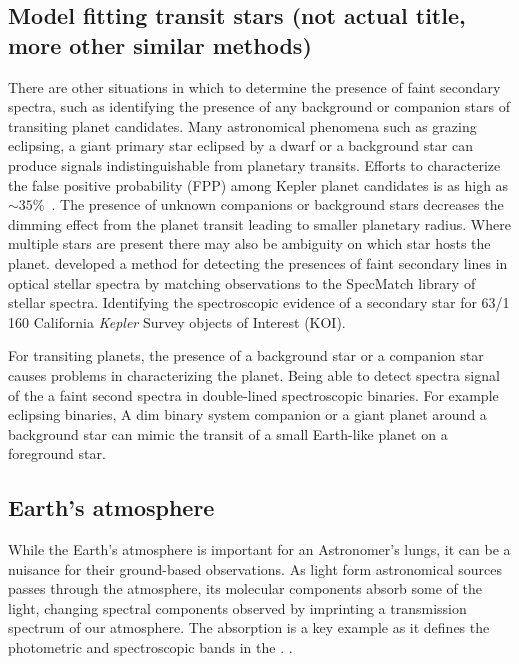 










\subsection{Model fitting transit stars (not actual title, more other similar methods)}
There are other situations in which to determine the presence of faint secondary spectra, such as identifying the presence of any background or companion stars of transiting planet candidates.
Many astronomical phenomena such as grazing eclipsing, a giant primary star eclipsed by a dwarf or a background star can produce signals indistinguishable from planetary transits.
Efforts to characterize the false positive probability (FPP) among Kepler planet candidates is as high as $\sim35\%$~\citep{santerne_sophie_2012}.
The presence of unknown companions or background stars decreases the dimming effect from the planet transit leading to smaller planetary radius.
Where multiple stars are present there may also be ambiguity on which star hosts the planet.
\citet{kolbl_detection_2015} developed a method for detecting the presences of faint secondary lines in optical stellar spectra by matching observations to the SpecMatch library of stellar spectra.
Identifying the spectroscopic evidence of a secondary star for 63/1\,160 California \emph{Kepler} Survey objects of Interest (KOI).


For transiting planets, the presence of a background star or a companion star causes problems in characterizing the planet.
Being able to detect spectra signal of the a faint second spectra in double-lined spectroscopic binaries.
For example eclipsing binaries,
A dim binary system companion or a giant planet around a background star can mimic the transit of a small Earth-like planet on a foreground star.






\subsection{Earth's atmosphere}
While the Earth's atmosphere is important for an Astronomer's lungs, it can be a nuisance for their ground-based observations.
As light form astronomical sources passes through the atmosphere, its molecular components absorb some of the light, changing spectral components observed by imprinting a transmission spectrum of our atmosphere.
The  absorption is a key example as it defines the photometric and spectroscopic bands in the \nir{}. .

